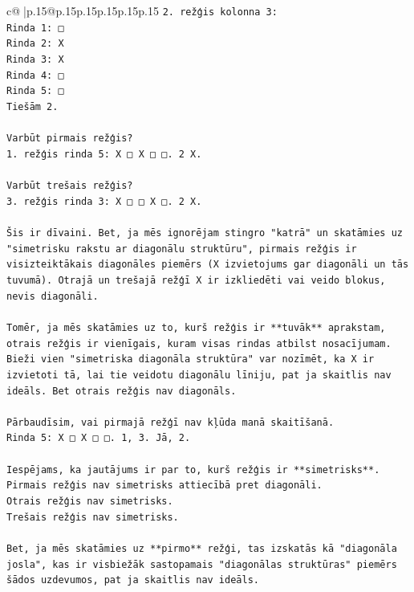 \documentclass{article}
\begin{document}
{\begin{supertabular}{c@{$\;$}|p{.15\linewidth}@{}p{.15\linewidth}p{.15\linewidth}p{.15\linewidth}p{.15\linewidth}p{.15\linewidth}}
{{{\texttt{2. režģis kolonna 3:} \\
\texttt{Rinda 1: □} \\
\texttt{Rinda 2: X} \\
\texttt{Rinda 3: X} \\
\texttt{Rinda 4: □} \\
\texttt{Rinda 5: □} \\
\texttt{Tiešām 2.} \\
\\ 
\texttt{Varbūt pirmais režģis?} \\
\texttt{1. režģis rinda 5: X □ X □ □. 2 X.} \\
\\ 
\texttt{Varbūt trešais režģis?} \\
\texttt{3. režģis rinda 3: X □ □ X □. 2 X.} \\
\\ 
\texttt{Šis ir dīvaini. Bet, ja mēs ignorējam stingro "katrā" un skatāmies uz "simetrisku rakstu ar diagonālu struktūru", pirmais režģis ir visizteiktākais diagonāles piemērs (X izvietojums gar diagonāli un tās tuvumā). Otrajā un trešajā režģī X ir izkliedēti vai veido blokus, nevis diagonāli.} \\
\\ 
\texttt{Tomēr, ja mēs skatāmies uz to, kurš režģis ir **tuvāk** aprakstam, otrais režģis ir vienīgais, kuram visas rindas atbilst nosacījumam. Bieži vien "simetriska diagonāla struktūra" var nozīmēt, ka X ir izvietoti tā, lai tie veidotu diagonālu līniju, pat ja skaitlis nav ideāls. Bet otrais režģis nav diagonāls.} \\
\\ 
\texttt{Pārbaudīsim, vai pirmajā režģī nav kļūda manā skaitīšanā.} \\
\texttt{Rinda 5: X □ X □ □. 1, 3. Jā, 2.} \\
\\ 
\texttt{Iespējams, ka jautājums ir par to, kurš režģis ir **simetrisks**.} \\
\texttt{Pirmais režģis nav simetrisks attiecībā pret diagonāli.} \\
\texttt{Otrais režģis nav simetrisks.} \\
\texttt{Trešais režģis nav simetrisks.} \\
\\ 
\texttt{Bet, ja mēs skatāmies uz **pirmo** režģi, tas izskatās kā "diagonāla josla", kas ir visbiežāk sastopamais "diagonālas struktūras" piemērs šādos uzdevumos, pat ja skaitlis nav ideāls.} \\
}}}
\end{supertabular}}
\end{document}
